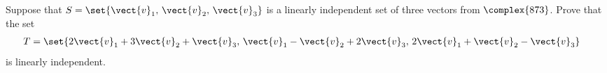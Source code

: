 Suppose that $S=\set{\vect{v}_1,\,\vect{v}_2,\,\vect{v}_3}$ is a linearly independent set of three vectors from $\complex{873}$.  Prove that the set
%
\begin{align*}
T&=
\set{
2\vect{v}_1+3\vect{v}_2+\vect{v}_3,\,
\vect{v}_1-\vect{v}_2+2\vect{v}_3,\,
2\vect{v}_1+\vect{v}_2-\vect{v}_3
}
\end{align*}
%
is linearly independent.
